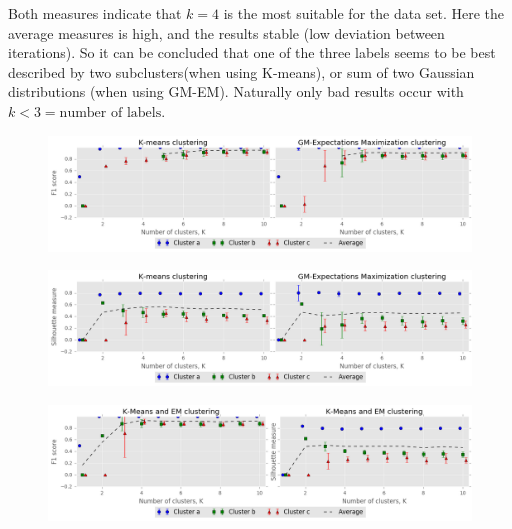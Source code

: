 \documentclass[a4paper,10pt,article,oneside,english]{memoir}
\let\oldcaption\caption
\renewcommand{\caption}[1]{\oldcaption{\emph{#1}}}
\begin{document}
Both measures indicate that $k=4$ is the most suitable for the data set. Here the average measures is high, and the results stable (low deviation between iterations). So it can be concluded that one of the three labels seems to be best described by two subclusters(when using K-means), or sum of two Gaussian distributions (when using GM-EM). Naturally only bad results occur with $k<3=\text{number of labels}$. 

\begin{figure}
	\centering
	\includegraphics[width=\textwidth]{f1_vs_k.png}
	\caption{}
	\label{fig:f1}
\end{figure}

\begin{figure}
	\centering
	\includegraphics[width=\textwidth]{silhouette_vs_k.png}
	\caption{}
	\label{fig:silhouette}
\end{figure}

\begin{figure}
	\centering
	\includegraphics[width=\textwidth]{combined_clustering.png}
	\caption{}
	\label{fig:combined_clustering}
\end{figure}
\end{document}
